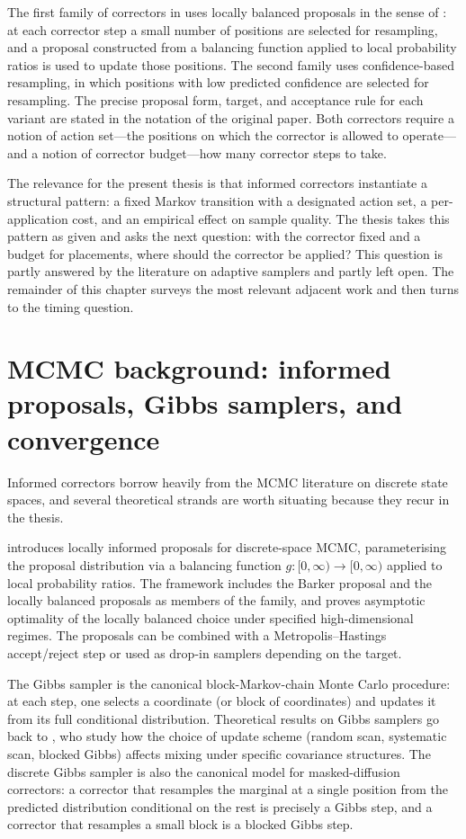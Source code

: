The first family of correctors in \textcite{zhao2024informedcorrectors}
uses locally balanced proposals in the sense of
\textcite{zanella2020informedproposals}: at each corrector step a small
number of positions are selected for resampling, and a proposal
constructed from a balancing function applied to local probability ratios
is used to update those positions. The second family uses
confidence-based resampling, in which positions with low predicted
confidence are selected for resampling. The precise proposal form,
target, and acceptance rule for each variant are stated in the notation
of the original paper. Both correctors require a notion of action
set---the positions on which the corrector is allowed to operate---and a
notion of corrector budget---how many corrector steps to take.

The relevance for the present thesis is that informed correctors
instantiate a structural pattern: a fixed Markov transition with a
designated action set, a per-application cost, and an empirical effect on
sample quality. The thesis takes this pattern as given and asks the next
question: with the corrector fixed and a budget for placements, where
should the corrector be applied? This question is partly answered by the
literature on adaptive samplers and partly left open. The remainder of this
chapter surveys the most relevant adjacent work and then turns to the
timing question.

\section{MCMC background: informed proposals, Gibbs samplers, and
convergence}
\label{lit:sec:mcmc}

Informed correctors borrow heavily from the MCMC literature on discrete
state spaces, and several theoretical strands are worth situating because
they recur in the thesis.

\textcite{zanella2020informedproposals} introduces locally informed
proposals for discrete-space MCMC, parameterising the proposal
distribution via a balancing function $g:[0,\infty)\to[0,\infty)$
applied to local probability ratios. The framework includes the Barker
proposal and the locally balanced proposals as members of the family,
and proves asymptotic optimality of the locally balanced choice under
specified high-dimensional regimes. The proposals can be combined with a
Metropolis--Hastings accept/reject step or used as drop-in samplers
depending on the target.

The Gibbs sampler is the canonical block-Markov-chain Monte Carlo
procedure: at each step, one selects a coordinate (or block of coordinates)
and updates it from its full conditional distribution. Theoretical results
on Gibbs samplers go back to \textcite{roberts1997updating}, who study how
the choice of update scheme (random scan, systematic scan, blocked Gibbs)
affects mixing under specific covariance structures. The discrete Gibbs
sampler is also the canonical model for masked-diffusion correctors: a
corrector that resamples the marginal at a single position from the
predicted distribution conditional on the rest is precisely a Gibbs step,
and a corrector that resamples a small block is a blocked Gibbs step.

